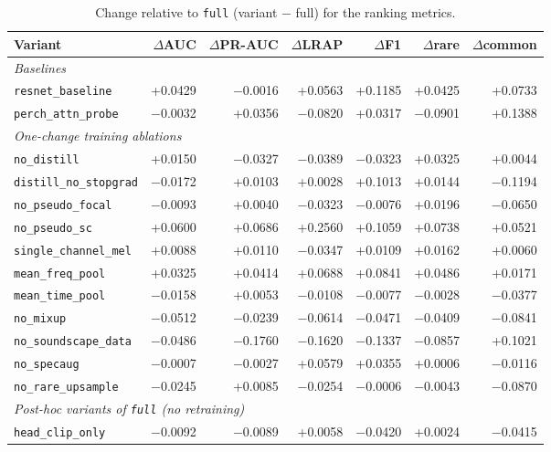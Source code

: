 \begin{table}[H]\centering\small
\caption{Change relative to \texttt{full} (variant $-$ full) for the ranking metrics.}\label{tab:delta_rank}
\setlength{\tabcolsep}{3.5pt}
\begin{adjustbox}{max width=\linewidth}
\begin{tabular}{lrrrrrr}
\toprule
Variant & $\Delta$AUC & $\Delta$PR-AUC & $\Delta$LRAP & $\Delta$F1 & $\Delta$rare & $\Delta$common \\
\midrule
\multicolumn{7}{l}{\emph{Baselines}} \\
\texttt{resnet\_baseline} & +0.0429 & $-$0.0016 & +0.0563 & +0.1185 & +0.0425 & +0.0733 \\
\texttt{perch\_attn\_probe} & $-$0.0032 & +0.0356 & $-$0.0820 & +0.0317 & $-$0.0901 & +0.1388 \\
\midrule
\multicolumn{7}{l}{\emph{One-change training ablations}} \\
\texttt{no\_distill} & +0.0150 & $-$0.0327 & $-$0.0389 & $-$0.0323 & +0.0325 & +0.0044 \\
\texttt{distill\_no\_stopgrad} & $-$0.0172 & +0.0103 & +0.0028 & +0.1013 & +0.0144 & $-$0.1194 \\
\texttt{no\_pseudo\_focal} & $-$0.0093 & +0.0040 & $-$0.0323 & $-$0.0076 & +0.0196 & $-$0.0650 \\
\texttt{no\_pseudo\_sc} & +0.0600 & +0.0686 & +0.2560 & +0.1059 & +0.0738 & +0.0521 \\
\texttt{single\_channel\_mel} & +0.0088 & +0.0110 & $-$0.0347 & +0.0109 & +0.0162 & +0.0060 \\
\texttt{mean\_freq\_pool} & +0.0325 & +0.0414 & +0.0688 & +0.0841 & +0.0486 & +0.0171 \\
\texttt{mean\_time\_pool} & $-$0.0158 & +0.0053 & $-$0.0108 & $-$0.0077 & $-$0.0028 & $-$0.0377 \\
\texttt{no\_mixup} & $-$0.0512 & $-$0.0239 & $-$0.0614 & $-$0.0471 & $-$0.0409 & $-$0.0841 \\
\texttt{no\_soundscape\_data} & $-$0.0486 & $-$0.1760 & $-$0.1620 & $-$0.1337 & $-$0.0857 & +0.1021 \\
\texttt{no\_specaug} & $-$0.0007 & $-$0.0027 & +0.0579 & +0.0355 & +0.0006 & $-$0.0116 \\
\texttt{no\_rare\_upsample} & $-$0.0245 & +0.0085 & $-$0.0254 & $-$0.0006 & $-$0.0043 & $-$0.0870 \\
\midrule
\multicolumn{7}{l}{\emph{Post-hoc variants of \texttt{full} (no retraining)}} \\
\texttt{head\_clip\_only} & $-$0.0092 & $-$0.0089 & +0.0058 & $-$0.0420 & +0.0024 & $-$0.0415 \\

\end{tabular}
\end{adjustbox}
\end{table}
